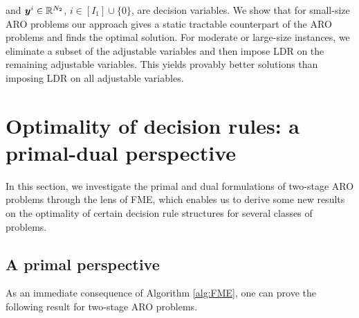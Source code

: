 \documentclass[fleqn,orsc,blindrev]{informs4}
\newcommand{\mb}[1]{\mbox{\boldmath \ensuremath{#1}}}
\renewcommand{\Re}{\mathbb{R}}
\begin{document}
and $\mb{y}^i \in \Re^{N_2}$, $i\in [I_1]\cup \{0\}$, are decision variables. We show that for small-size ARO problems our approach gives a static tractable counterpart of the ARO problems and finds the optimal solution. For moderate or large-size instances, we eliminate a subset of the adjustable variables and then impose LDR on the remaining adjustable variables. This yields provably better solutions than imposing LDR on all adjustable variables.
	

		
	\section{Optimality of decision rules: a primal-dual perspective} \label{sec:ODR}
	In this section, we investigate the primal and dual formulations of two-stage ARO problems through the lens of FME, which enables us to derive some new results on the optimality of certain decision rule structures for several classes of problems.
	
\subsection{A primal perspective}
As an immediate consequence of Algorithm \ref{alg:FME}, one can prove the following result for two-stage ARO problems. 
\end{document}
